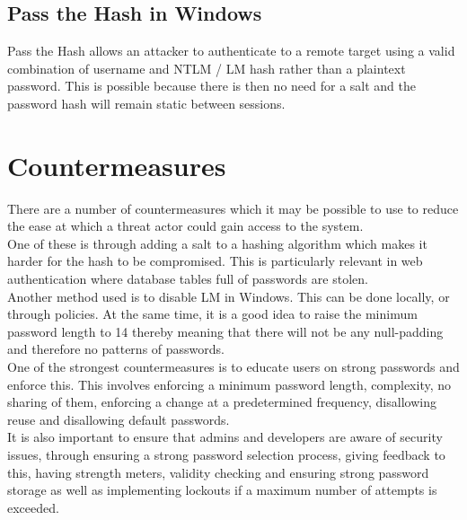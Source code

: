 \subsection{Pass the Hash in Windows}
Pass the Hash allows an attacker to authenticate to a remote target using a valid combination of username and NTLM / LM hash rather than a plaintext password. This is possible because there is then no need for a salt and the password hash will remain static between sessions. 

\section{Countermeasures}
There are a number of countermeasures which it may be possible to use to reduce the ease at which a threat actor could gain access to the system. \\

One of these is through adding a salt to a hashing algorithm which makes it harder for the hash to be compromised. This is particularly relevant in web authentication where database tables full of passwords are stolen. \\

Another method used is to disable LM in Windows. This can be done locally, or through policies. At the same time, it is a good idea to raise the minimum password length to 14 thereby meaning that there will not be any null-padding and therefore no patterns of passwords. \\

One of the strongest countermeasures is to educate users on strong passwords and enforce this. This involves enforcing a minimum password length, complexity, no sharing of them, enforcing a change at a predetermined frequency, disallowing reuse and disallowing default passwords.\\

It is also important to ensure that admins and developers are aware of security issues, through ensuring a strong password selection process, giving feedback to this, having strength meters, validity checking and ensuring strong password storage as well as implementing lockouts if a maximum number of attempts is exceeded. 